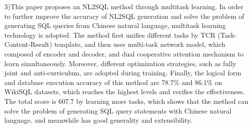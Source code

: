 \begin{englishabstract}
3)This paper proposes an NL2SQL method through multitask learning.
In order to further improve the accuracy of NL2SQL generation and solve the problem of generating SQL queries from Chinese natural language, multitask learning technology is adopted.
The method first unifies different tasks by TCR  (Task-Content-Result) template, and then uses multi-task network model, which composed of encoder and decoder, and dual cooperative attention mechanism to learn simultaneously.
Moreover, different optimization strategies, such as fully joint and anti-curriculum, are adopted during training.
Finally, the logical form and database execution accuracy of this method are 78.7\% and 86.1\% on WikiSQL datasets, which reaches the highest levels and verifies the effectiveness.
The total score is 607.7 by learning more tasks, which shows that the method can solve the problem of generating SQL query statements with Chinese natural language, and meanwhile has good generality and extensibility.


\end{englishabstract}

